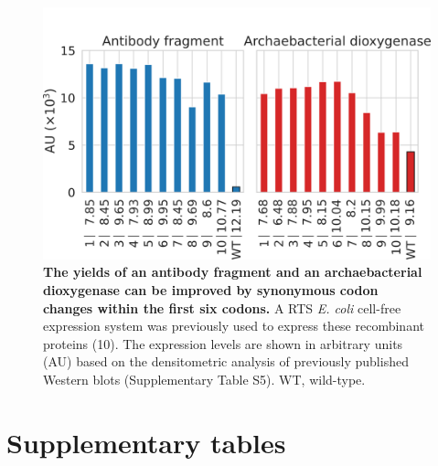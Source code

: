 \begin{figure}[htbp!]
	\center
	\includegraphics[width=1\textwidth]{appendix/TIsigner/Figs/S14.png}
	\caption[The yields of an antibody fragment and an archaebacterial dioxygenase can be improved by synonymous codon changes within the first six codons.]{\textbf{The yields of an antibody fragment and an archaebacterial dioxygenase can be improved by synonymous codon changes within the first six codons.} A RTS \textit{E. coli} cell-free expression system was previously used to express these recombinant proteins (10). The expression levels are shown in arbitrary units (AU) based on the densitometric analysis of previously published Western blots (Supplementary Table S5). WT, wild-type.
	}
	\label{fig:appendix_TIsigner_S14}
\end{figure}

\clearpage

\section{Supplementary tables}


